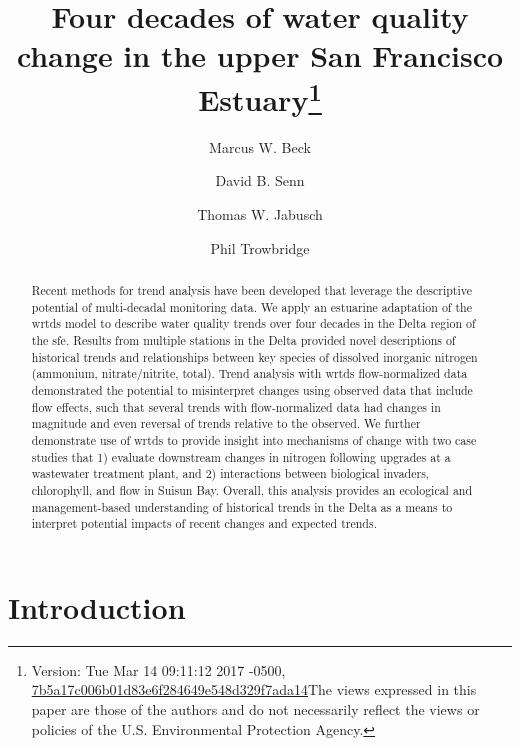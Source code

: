 \documentclass[journal = esthag, manuscript = article]{achemso}\usepackage[]{graphicx}\usepackage[]{color}
\author{Marcus W. Beck}
\affiliation{USEPA National Health and Environmental Effects Research Laboratory, Gulf Ecology Division, Gulf Breeze, FL}
\author{David B. Senn}
\author{Thomas W. Jabusch}
\author{Phil Trowbridge}
\affiliation{San Francisco Estuary Institute, Richmond, CA}
\title[Water quality change in the upper SFE]{Four decades of water quality change in the upper San Francisco Estuary\footnote{Version: Tue Mar 14 09:11:12 2017 -0500, \href{https://github.com/fawda123/sftrends_manu/commit/7b5a17c006b01d83e6f284649e548d329f7ada14}{7b5a17c006b01d83e6f284649e548d329f7ada14}\newline The views expressed in this paper are those of the authors and do not necessarily reflect the views or policies of the U.S. Environmental Protection Agency.}}
\begin{document}
\linenumbers

\begin{abstract}
\noindent Recent methods for trend analysis have been developed that leverage the descriptive potential of multi-decadal monitoring data.  We apply an estuarine adaptation of the \ac{wrtds} model to describe water quality trends over four decades in the Delta region of the \ac{sfe}. Results from multiple stations in the Delta provided novel descriptions of historical trends and relationships between key species of dissolved inorganic nitrogen (ammonium, nitrate/nitrite, total).  Trend analysis with \ac{wrtds} flow-normalized data demonstrated the potential to misinterpret changes using observed data that include flow effects, such that several trends with flow-normalized data had changes in magnitude and even reversal of trends relative to the observed.  We further demonstrate use of \ac{wrtds} to provide insight into mechanisms of change with two case studies that 1) evaluate downstream changes in nitrogen following upgrades at a wastewater treatment plant, and 2) interactions between biological invaders, chlorophyll, and flow in Suisun Bay.  Overall, this analysis provides an ecological and management-based understanding of historical trends in the Delta as a means to interpret potential impacts of recent changes and expected trends.
\end{abstract}
\acresetall

\section{Introduction}
\end{document}
